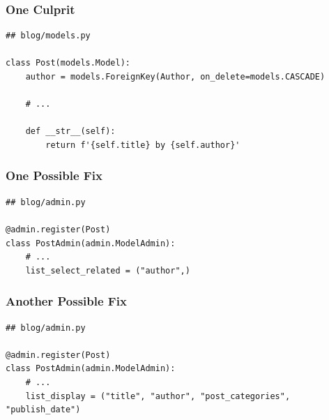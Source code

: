 \documentclass[aspectratio=169]{beamer}
\begin{document}
\begin{frame}[fragile]
\frametitle{One Culprit}

{\tiny
\begin{verbatim}
## blog/models.py

class Post(models.Model):
    author = models.ForeignKey(Author, on_delete=models.CASCADE)

    # ...

    def __str__(self):
        return f'{self.title} by {self.author}'
\end{verbatim}
}

\end{frame}


\begin{frame}[fragile]
\frametitle{One Possible Fix}

{\tiny
\begin{verbatim}
## blog/admin.py

@admin.register(Post)
class PostAdmin(admin.ModelAdmin):
    # ...
    list_select_related = ("author",)
\end{verbatim}
}

\end{frame}


\begin{frame}[fragile]
\frametitle{Another Possible Fix}

{\tiny
\begin{verbatim}
## blog/admin.py

@admin.register(Post)
class PostAdmin(admin.ModelAdmin):
    # ...
    list_display = ("title", "author", "post_categories", "publish_date")
\end{verbatim}
}

\end{frame}


\begin{frame}
  \begin{figure}[p]
    \centering
  \end{figure}
\end{frame}
\end{document}
